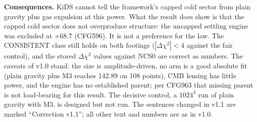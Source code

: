 \documentclass[10pt]{article}
\begin{document}
{{\textbf{Consequences.} KiDS cannot tell the framework's capped cold sector from plain gravity plus gas expulsion at this power. What the result does show is that the capped cold sector does not overproduce structure: the uncapped settling engine was excluded at $+68.7$ (CFG596). It is not a preference for the law. The CONSISTENT class still holds on both footings ($|\Delta\chi^2|<4$ against the fair control), and the stored $\Delta\chi^2$ values against NCS0 are correct as numbers. The caveats of v1.0 stand: the size is amplitude-driven, no arm is a good absolute fit (plain gravity plus M3 reaches 142.89 on 108 points), CMB lensing has little power, and the engine has no established parent; per CFG963 that missing parent is not load-bearing for this result. The decisive control, a $1024^3$ run of plain gravity with M3, is designed but not run. The sentences changed in v1.1 are marked ``Correction v1.1''; all other text and numbers are as in v1.0.}}
\end{document}
